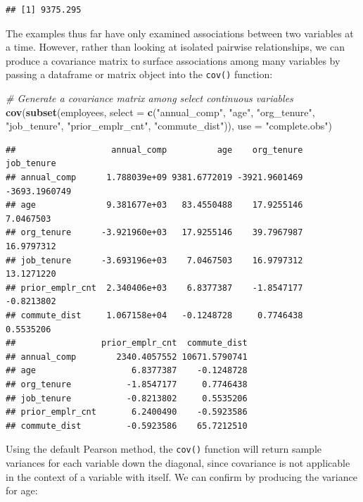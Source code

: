 \documentclass[]{book}
\newenvironment{Shaded}{\begin{snugshade}}{\end{snugshade}}
\newcommand{\CommentTok}[1]{\textcolor[rgb]{0.56,0.35,0.01}{\textit{#1}}}
\newcommand{\DataTypeTok}[1]{\textcolor[rgb]{0.13,0.29,0.53}{#1}}
\newcommand{\KeywordTok}[1]{\textcolor[rgb]{0.13,0.29,0.53}{\textbf{#1}}}
\newcommand{\NormalTok}[1]{#1}
\newcommand{\OperatorTok}[1]{\textcolor[rgb]{0.81,0.36,0.00}{\textbf{#1}}}
\newcommand{\StringTok}[1]{\textcolor[rgb]{0.31,0.60,0.02}{#1}}
\begin{document}
\begin{verbatim}
## [1] 9375.295
\end{verbatim}

The examples thus far have only examined associations between two variables at a time. However, rather than looking at isolated pairwise relationships, we can produce a covariance matrix to surface associations among many variables by passing a dataframe or matrix object into the \texttt{cov()} function:

\begin{Shaded}
\begin{Highlighting}[]
\CommentTok{# Generate a covariance matrix among select continuous variables}
\KeywordTok{cov}\NormalTok{(}\KeywordTok{subset}\NormalTok{(employees, }\DataTypeTok{select =} \KeywordTok{c}\NormalTok{(}\StringTok{"annual_comp"}\NormalTok{, }\StringTok{"age"}\NormalTok{, }\StringTok{"org_tenure"}\NormalTok{, }\StringTok{"job_tenure"}\NormalTok{, }\StringTok{"prior_emplr_cnt"}\NormalTok{, }\StringTok{"commute_dist"}\NormalTok{)), }\DataTypeTok{use =} \StringTok{"complete.obs"}\NormalTok{)}
\end{Highlighting}
\end{Shaded}

\begin{verbatim}
##                   annual_comp          age    org_tenure    job_tenure
## annual_comp      1.788039e+09 9381.6772019 -3921.9601469 -3693.1960749
## age              9.381677e+03   83.4550488    17.9255146     7.0467503
## org_tenure      -3.921960e+03   17.9255146    39.7967987    16.9797312
## job_tenure      -3.693196e+03    7.0467503    16.9797312    13.1271220
## prior_emplr_cnt  2.340406e+03    6.8377387    -1.8547177    -0.8213802
## commute_dist     1.067158e+04   -0.1248728     0.7746438     0.5535206
##                 prior_emplr_cnt  commute_dist
## annual_comp        2340.4057552 10671.5790741
## age                   6.8377387    -0.1248728
## org_tenure           -1.8547177     0.7746438
## job_tenure           -0.8213802     0.5535206
## prior_emplr_cnt       6.2400490    -0.5923586
## commute_dist         -0.5923586    65.7212510
\end{verbatim}

Using the default Pearson method, the \texttt{cov()} function will return sample variances for each variable down the diagonal, since covariance is not applicable in the context of a variable with itself. We can confirm by producing the variance for age:

\begin{Shaded}
\end{Shaded}
\end{document}

